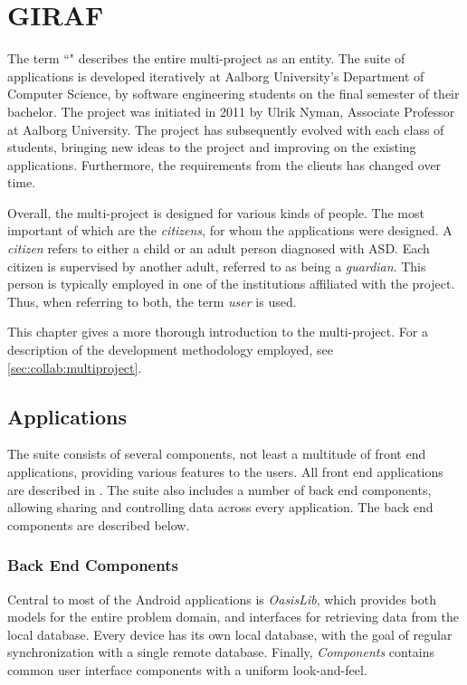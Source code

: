 \chapter{GIRAF}\label{chap:giraf}
The term ``\giraf" describes the entire multi-project as an entity.
The suite of \giraf applications is developed iteratively at Aalborg University's Department of Computer Science, by software engineering students on the final semester of their bachelor.
The project was initiated in 2011 by Ulrik Nyman, Associate Professor at Aalborg University.
The project has subsequently evolved with each class of students, bringing new ideas to the project and improving on the existing applications.
Furthermore, the requirements from the clients has changed over time.

Overall, the multi-project is designed for various kinds of people.
The most important of which are the \textit{citizens}, for whom the applications were designed.
A \textit{citizen} refers to either a child or an adult person diagnosed with ASD.
Each citizen is supervised by another adult, referred to as being a \textit{guardian}.
This person is typically employed in one of the institutions affiliated with the \giraf project.
Thus, when referring to both, the term \textit{user} is used.

This chapter gives a more thorough introduction to the \giraf multi-project.
For a description of the development methodology employed, see \cref{sec:collab:multiproject}.

\section{\giraf Applications}\label{sec:giraf:applications}
The \giraf suite consists of several components, not least a multitude of front end applications, providing various features to the users. 
All front end applications are described in . 
The suite also includes a number of back end components, allowing sharing and controlling data across every application. 
The back end components are described below.

\subsection{Back End Components}\label{sec:giraf:applications:backend}
Central to most of the Android applications is \textit{OasisLib}, which provides both models for the entire problem domain, and interfaces for retrieving data from the local database.
Every device has its own local database, with the goal of regular synchronization with a single remote database. 
Finally, \textit{\giraf Components} contains common user interface components with a uniform look-and-feel. 

